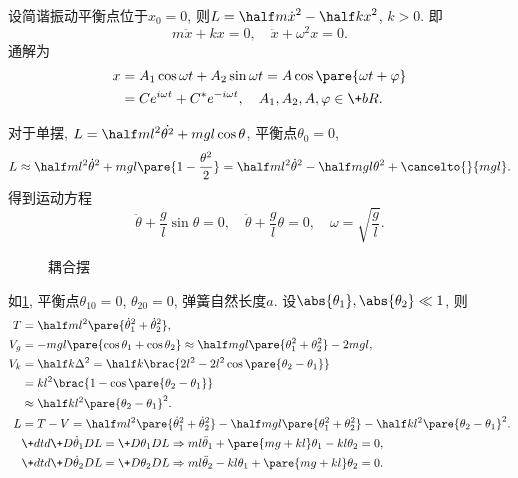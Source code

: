 \documentclass{ctexart}
\begin{document}
设简谐振动平衡点位于$x_0=0$, 则$\displaystyle L = \half m\dot{x}^2 - \half kx^2$, $k>0$. 即
\[ m\ddot{x} + kx = 0,\quad \ddot{x} + \omega^2 x = 0. \]
通解为
\begin{align*}
    x &= A_1 \cos\omega t + A_2 \sin\omega t = A\cos\pare{\omega t + \varphi} \\ &= Ce^{i\omega t} + C^* e^{-i\omega t},\quad A_1, A_2, A, \varphi \in \+bR.
\end{align*}
\begin{sample}
    \begin{ex}
        对于单摆, $\displaystyle L = \half ml^2\dot{\theta^2} + mgl\cos\theta$, 平衡点$\theta_0 = 0$,
        \[ L \approx \half ml^2\dot{\theta}^2 + mgl\pare{1-\frac{\theta^2}{2}} = \half ml^2\dot{\theta}^2 - \half mgl\theta^2 + \cancelto{}{mgl}. \]
        得到运动方程
        \[ \ddot{\theta} + \frac{g}{l}\sin\theta = 0,\quad \ddot{\theta} + \frac{g}{l}\theta = 0,\quad \omega = \sqrt{\frac{g}{l}}. \]
    \end{ex}
\end{sample}
\begin{figure}[ht]
    \centering
    \caption{耦合摆}
    \label{fig:耦合摆}
\end{figure}
\begin{sample}
    \begin{ex}[耦合摆]
        \label{ex:耦合摆}
        如\cref{fig:耦合摆}, 平衡点$\theta_{10} = 0$, $\theta_{20} = 0$, 弹簧自然长度$a$. 设$\abs{\theta_1}, \abs{\theta_2}\ll 1$, 则
        \begin{align}
            T &= \half ml^2\pare{\dot{\theta}_1^2 + \dot{\theta}_2^2}, \notag\\
            V_g &= -mgl\pare{\cos\theta_1 + \cos\theta_2} \approx \half mgl\pare{\theta_1^2 + \theta_2^2} - 2mgl, \notag\\
            V_k &= \half k \Delta^2 = \half k\brac{2l^2 - 2l^2 \cos\pare{\theta_2 - \theta_1}}\notag\\
            &= kl^2 \brac{1-\cos\pare{\theta_2 - \theta_1}} \notag\\
            &\approx \half kl^2 \pare{\theta_2 - \theta_1}^2.\notag\\
            L &= T-V = \half ml^2\pare{\dot{\theta}_1^2 + \dot{\theta}_2^2} - \half mgl\pare{\theta_1^2 + \theta_2^2} - \half kl^2\pare{\theta_2 - \theta_1}^2.\notag\\
            \label{eq:耦合摆1}
            &\+dtd{}\+D{\dot{\theta}_1}DL = \+D{\theta_1}DL \Rightarrow ml\ddot{\theta}_1 + \pare{mg+kl}\theta_1 - kl\theta_2 = 0, \\
            \label{eq:耦合摆2}
            &\+dtd{}\+D{\dot{\theta}_2}DL = \+D{\theta_2}DL \Rightarrow ml\ddot{\theta}_2 - kl\theta_1 + \pare{mg+kl}\theta_2 = 0.
        \end{align}
    \end{ex}
\end{sample}
\end{document}
